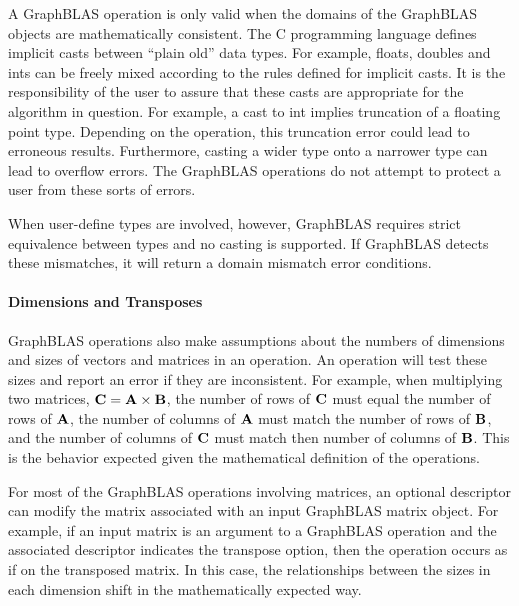 A GraphBLAS operation is only valid when the domains of the GraphBLAS objects are
mathematically consistent.  The C programming language defines implicit casts 
between ``plain old'' data types.  For example, floats, doubles and ints can be 
freely mixed according to the rules defined for implicit casts.  It is the 
responsibility of the user to assure that these casts are appropriate for the 
algorithm in question.  For example, a cast to int implies truncation of a floating 
point type.  Depending on the operation, this truncation error could lead to
erroneous results.  Furthermore, casting a wider type onto a narrower type can lead 
to overflow errors.  The GraphBLAS operations do not attempt to protect a user from 
these sorts of errors.

When user-define types are involved, however, GraphBLAS requires strict equivalence
between types and no casting is supported.  If GraphBLAS detects these mismatches,
it will return a domain mismatch error conditions.


\paragraph{Dimensions and Transposes}

GraphBLAS operations also make assumptions about the numbers of dimensions and 
sizes of vectors and matrices in an operation.   An operation will test these 
sizes and report an error if they are inconsistent.  For example, when multiplying 
two matrices, ${\bf C} = {\bf A} \times {\bf B}$, the number of rows of 
${\bf C}$ must equal the number of rows of ${\bf A}$, the number of columns 
of ${\bf A}$ must match the number of rows of ${\bf B}$, and the number of 
columns of ${\bf C}$ must match then number of columns of ${\bf B}$.  This 
is the behavior expected given the mathematical definition of the operations.   

For most of the GraphBLAS operations involving matrices, an optional descriptor 
can modify the matrix associated with an input GraphBLAS matrix object.  For 
example, if an input matrix is an argument to a GraphBLAS operation and the 
associated descriptor indicates the transpose option, then the operation occurs 
as if on the transposed matrix.  In this case, the relationships between the 
sizes in each dimension shift in the mathematically expected way. 

